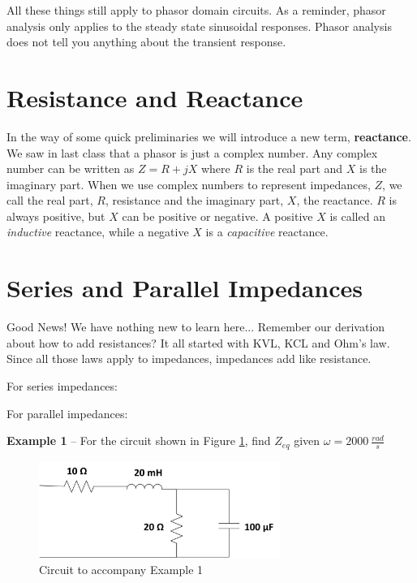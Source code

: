 \documentclass{handout}
\begin{document}
All these things still apply to phasor domain circuits. As a reminder, phasor analysis only applies to the steady state sinusoidal responses.  Phasor analysis does not tell you anything about the transient response.

\section{Resistance and Reactance}
In the way of some quick preliminaries we will introduce a new term, \textbf{reactance}.  We saw in last class that a phasor is just a complex number.  Any complex number can be written as $Z = R +jX$ where $R$ is the real part and $X$ is the imaginary part.  When we use complex numbers to represent impedances, $Z$, we call the real part, $R$, resistance and the imaginary part, $X$, the reactance.  $R$ is always positive, but $X$ can be positive or negative. A positive $X$ is called an {\em inductive} reactance, while a negative $X$ is a {\em capacitive} reactance.  

\section{Series and Parallel Impedances}
Good News!  We have nothing new to learn here... Remember our derivation about how to add resistances?  It all started with KVL, KCL and Ohm's law.  Since all those laws apply to impedances, impedances add like resistance.

For series impedances:
\soln{1in}{
\[
Z_{eq} = Z_1+Z_2+Z_3+.....+Z_k =\sum_{n=1}^k Z_n
\]
}

For parallel impedances:
\soln{1in}{
\[
Z_{eq} = \frac{1}{\frac{1}{Z_1}+\frac{1}{Z_2}+\frac{1}{Z_3}+.....+\frac{1}{Z_k}} =\left[\sum_{n=1}^k \frac{1}{Z_n}\right]^{-1}
\]
}

\textbf{Example 1} -- For the circuit shown in Figure \ref{fig: Example1}, find $Z_{eq}$ given $\omega = 2000\ \frac{rad}{s}$

\begin{figure} [h!]
\centering
\includegraphics[width=0.7\textwidth]{Example1.jpg}
\caption{Circuit to accompany Example 1}
\label{fig: Example1}
\end{figure}
\end{document}
